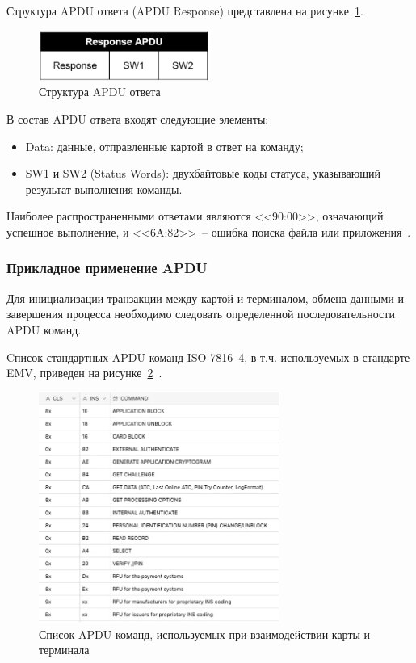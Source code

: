 Структура APDU ответа (APDU Response) представлена на рисунке~\ref{fig:apdu_resp}.

\begin{figure}[H]
    \centering
    \includegraphics[width=0.5\textwidth]{images/research/apdu_resp}
    \caption{\centering Структура APDU ответа}
    \label{fig:apdu_resp}
\end{figure}

В состав APDU ответа входят следующие элементы:

\begin{itemize}
    \item Data: данные, отправленные картой в ответ на команду;
    \item SW1 и SW2 (Status Words): двухбайтовые коды статуса, указывающий результат выполнения команды.
\end{itemize}

Наиболее распространенными ответами являются <<90:00>>, означающий успешное выполнение, и <<6A:82>>~-- ошибка поиска файла или приложения~\cite{apdu_resp}.


\subsubsection{Прикладное применение APDU}

Для инициализации транзакции между картой и терминалом, обмена данными и завершения процесса необходимо следовать определенной последовательности APDU команд.

Cписок стандартных APDU команд ISO 7816--4, в т.ч. используемых в стандарте EMV, приведен на рисунке~\ref{fig:apdu_commands}~\cite{iso7816-4}.

\begin{figure}[H]
    \centering
    \includegraphics[width=0.7\textwidth]{images/research/apdu_commands}
    \caption{\centering Список APDU команд, используемых при взаимодействии карты и терминала}
    \label{fig:apdu_commands}
\end{figure}

